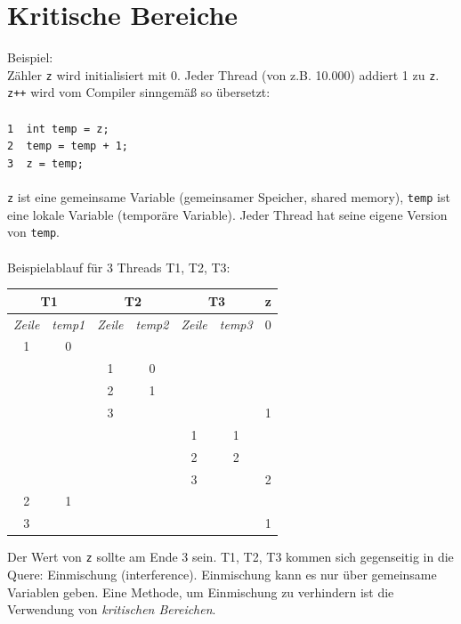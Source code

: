 \section{Kritische Bereiche}
Beispiel:\\
Zähler \texttt{z} wird initialisiert mit 0. Jeder Thread (von z.B. 10.000) addiert 1 zu \texttt{z}. \texttt{z++} wird vom Compiler sinngemäß so übersetzt:\\
\\
\texttt{1 \ int temp = z;} \\
\texttt{2 \ temp = temp + 1;} \\
\texttt{3 \ z = temp;} \\
\\
\texttt{z} ist eine gemeinsame Variable (gemeinsamer Speicher, shared memory), \texttt{temp} ist eine lokale Variable (temporäre Variable).
Jeder Thread hat seine eigene Version von \texttt{temp}.\\
\\
Beispielablauf für 3 Threads T1, T2, T3:
\begin{center}
\begin{tabular}{c|c|c|c|c|c|c}
\multicolumn{2}{c|}{\textbf{T1}} & \multicolumn{2}{c|}{\textbf{T2}} & \multicolumn{2}{c|}{\textbf{T3}} & \textbf{z} \\ \hline
\emph{Zeile} & \emph{temp1} & \emph{Zeile} & \emph{temp2} & \emph{Zeile} & \emph{temp3} & 0 \\ \cline{1-6}
1 & 0 & {} & {} & {} & {} & {} \\
{} & {} & 1 & 0 & {} & {} & {} \\ 
{} & {} & 2 & 1 & {} & {} & {} \\ 
{} & {} & 3 & {} & {} & {} & 1 \\ 
{} & {} & {} & {} & 1 & 1 & {} \\ 
{} & {} & {} & {} & 2 & 2 & {} \\ 
{} & {} & {} & {} & 3 & {} & 2 \\ 
2 & 1 & {} & {} & {} & {} & {} \\ 
3 & {} & {} & {} & {} & {} & 1 \\ 
\end{tabular}
\end{center}

Der Wert von \texttt{z} sollte am Ende 3 sein. T1, T2, T3 kommen sich gegenseitig in die Quere: Einmischung (interference). Einmischung kann es nur über gemeinsame Variablen geben.
Eine Methode, um Einmischung zu verhindern ist die Verwendung von \emph{kritischen Bereichen}.

